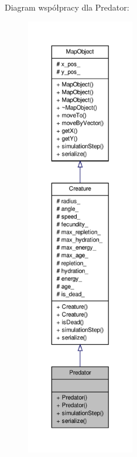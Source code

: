 Diagram współpracy dla Predator\-:
\nopagebreak
\begin{figure}[H]
\begin{center}
\leavevmode
\includegraphics[height=550pt]{classPredator__coll__graph}
\end{center}
\end{figure}
